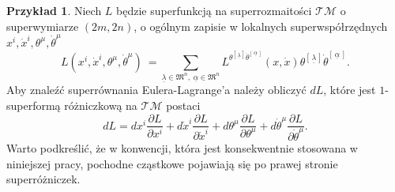 \documentclass[11pt,a4paper]{report}
\theoremstyle{definition}
\newtheorem{example}[theorem]{Przykład}
\begin{document}
\begin{example} Niech $L$ będzie superfunkcją na superrozmaitości $\mathcal{TM}$ o superwymiarze $(2m, 2n)$, o ogólnym zapisie w lokalnych superwspółrzędnych $x^i, \dot x^i, \theta^\mu, \dot \theta^\mu$
	\begin{equation*}
		L (x^i, \dot x^i, \theta^\mu, \dot \theta^\mu) \ = \!\!\!\!\!\!\!\!
		\sum_{\underline{\lambda} \in \mathfrak{M}^n,\; \underline{\alpha} \in \mathfrak{M}^n} \!\!\!\!\!\!\!\! L^{\theta^{\left[\, \underline{\lambda}\, \right]} \dot \theta^{\left[\, \underline{\alpha}\, \right]}} (x, \dot x) \theta^{\left[\, \underline{\lambda}\, \right]} \dot \theta^{\left[\, \underline{\alpha}\, \right]}.
	\end{equation*}
	Aby znaleźć superrównania Eulera-Lagrange'a należy obliczyć $dL$, które jest $1$-superformą różniczkową na $\mathcal{TM}$ postaci
	\begin{equation*}
		dL = dx^i\frac{\partial L}{\partial x^i}+d\dot x^i\frac{\partial L}{\partial \dot x^i}+d\theta^\mu\frac{\partial L}{\partial \theta^\mu}+d\dot \theta^\mu\frac{\partial L}{\partial \dot\theta^\mu}.
	\end{equation*}
	Warto podkreślić, że w konwencji, która jest konsekwentnie stosowana w niniejszej pracy, pochodne cząstkowe pojawiają się po prawej stronie superróżniczek.
						      					

\end{example}
\end{document}
